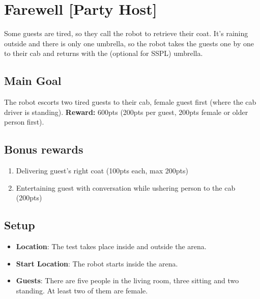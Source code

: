 \section{Farewell [Party Host]}
\label{test:farewell}
Some guests are tired, so they call the robot to retrieve their coat.
It's raining outside and there is only one umbrella, so the robot takes the guests one by one to their cab and returns with the (optional for SSPL) umbrella.


\subsection*{Main Goal}
The robot escorts two tired guests to their cab, female guest first (where the cab driver is standing).
\noindent\textbf{Reward:} 600pts (200pts per guest, 200pts female or older person first).

\subsection*{Bonus rewards}
\begin{enumerate}[nosep]
	\item Delivering guest's right coat (100pts each, max 200pts)
	\item Entertaining guest with conversation while ushering person to the cab (200pts)
	
\end{enumerate}


\subsection*{Setup}
\begin{itemize}
	\item \textbf{Location}: The test takes place inside and outside the arena.

	\item \textbf{Start Location}: The robot starts inside the arena.

	\item \textbf{Guests}: There are five people in the living room, three sitting and two standing. At least two of them are female.
\end{itemize}

